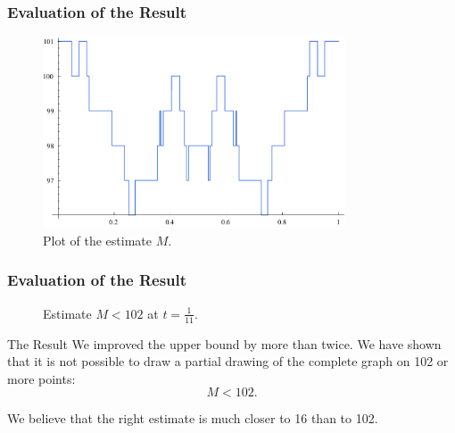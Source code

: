\documentclass{beamer}
\begin{document}

\begin{frame}
\frametitle{Evaluation of the Result}
\begin{figure}[t]
\centering
\includegraphics[width=0.8\textwidth]{./figures/all-together-more-than-two-thirds.pdf}%
\caption{Plot of the estimate $M$.}
\end{figure}
\end{frame}


\begin{frame}
\frametitle{Evaluation of the Result}
\begin{figure}[t] %
\centering
\resizebox{4cm}{!}{%

}
\caption{Estimate $M < 102$ at $t = \frac{1}{11}$.}
\end{figure}
\end{frame}

\begin{frame}
\begin{block}{The Result}
We improved the upper bound by more than twice. We have shown that it
is not possible to draw a partial drawing of the complete graph on
102 or more points:
$$M < 102.$$

\end{block}
\begin{figure}[H]
\centering

\end{figure}

We believe that the right estimate is much closer to 16 than to 102.
\end{frame}
\end{document}
